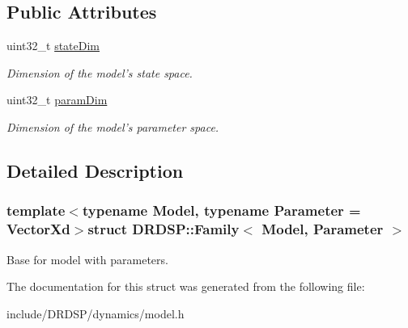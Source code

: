 \subsection*{Public Attributes}
\begin{DoxyCompactItemize}
\item 
\hypertarget{struct_d_r_d_s_p_1_1_family_ae2e7aabde5a620540f4771f1fac6da78}{uint32\-\_\-t \hyperlink{struct_d_r_d_s_p_1_1_family_ae2e7aabde5a620540f4771f1fac6da78}{state\-Dim}}\label{struct_d_r_d_s_p_1_1_family_ae2e7aabde5a620540f4771f1fac6da78}

\begin{DoxyCompactList}\small\item\em Dimension of the model's state space. \end{DoxyCompactList}\item 
\hypertarget{struct_d_r_d_s_p_1_1_family_a364eac2f469c96b1584ffbd66ea49e81}{uint32\-\_\-t \hyperlink{struct_d_r_d_s_p_1_1_family_a364eac2f469c96b1584ffbd66ea49e81}{param\-Dim}}\label{struct_d_r_d_s_p_1_1_family_a364eac2f469c96b1584ffbd66ea49e81}

\begin{DoxyCompactList}\small\item\em Dimension of the model's parameter space. \end{DoxyCompactList}\end{DoxyCompactItemize}


\subsection{Detailed Description}
\subsubsection*{template$<$typename Model, typename Parameter = Vector\-Xd$>$struct D\-R\-D\-S\-P\-::\-Family$<$ Model, Parameter $>$}

Base for model with parameters. 

The documentation for this struct was generated from the following file\-:\begin{DoxyCompactItemize}
\item 
include/\-D\-R\-D\-S\-P/dynamics/model.\-h\end{DoxyCompactItemize}
